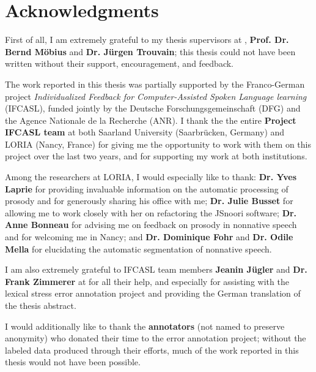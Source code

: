 %
\chapter*{Acknowledgments}
\label{sec:thanks}
\vspace*{-10mm}


First of all, I am extremely grateful to my thesis supervisors at {\thesisUniversity}, \textbf{Prof. Dr. Bernd Möbius} and \textbf{Dr. Jürgen Trouvain}; this thesis could not have been written without their support, encouragement, and feedback.

The work reported in this thesis was partially supported by the Franco-German project \textit{Individualized Feedback for Computer-Assisted Spoken Language learning} (IFCASL), funded jointly by the Deutsche Forschungsgemeinschaft (DFG) and the Agence Nationale de la Recherche (ANR). I thank the the entire \textbf{Project IFCASL team} at both Saarland University (Saarbrücken, Germany) and LORIA (Nancy, France) for giving me the opportunity to work with them on this project over the last two years, and for supporting my work at both institutions.

Among the researchers at LORIA, I would especially like to thank:
\textbf{Dr. Yves Laprie} for providing invaluable information on the automatic processing of prosody and for generously sharing his office with me;
\textbf{Dr. Julie Busset} for allowing me to work closely with her on refactoring the JSnoori software; %
\textbf{Dr. Anne Bonneau} for advising me on feedback on prosody in nonnative speech and for welcoming me in Nancy;
and 
\textbf{Dr. Dominique Fohr} and \textbf{Dr. Odile Mella} for elucidating the automatic segmentation of nonnative speech. 

I am also extremely grateful to IFCASL team members \textbf{Jeanin Jügler} and \textbf{Dr. Frank Zimmerer} at {\thesisUniversity} for all their help, and especially for assisting with the lexical stress error annotation project and providing the German translation of the thesis abstract. 

I would additionally like to thank the \textbf{annotators} (not named to preserve anonymity) who donated their time to the error annotation project; without the labeled data produced through their efforts, much of the work reported in this thesis would not have been possible.

